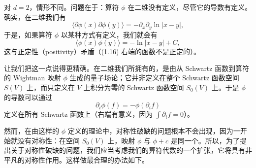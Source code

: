 
对 $d=2$，情形不同。问题在于：算符 $\phi$ 在二维没有定义，尽管它的导数有定义。确实，在二维我们有
\begin{equation}
  \tag{1.15}
  \label{eq:1-15}
  \langle\partial\phi(x)\partial\phi(y)\rangle=-\partial_x\partial_y\ln|x-y|,
\end{equation}
于是，如果算符 $\phi$ 以某种方式有定义，我们就会有
\begin{equation}
  \tag{1.16}
  \label{eq:1-16}
  \langle\phi(x)\phi(y)\rangle=-\ln|x-y|+C,
\end{equation}
这与正定性（positivity）矛盾（(1.16) 右端的函数不是正定的）。


让我们把这一点说得更精确。在二维我们所拥有的，是由从 Schwartz 函数到算符的 Wightman 映射 $\phi$ 生成的量子场论；它并非定义在整个 Schwartz 函数空间 $S(V)$ 上，而只定义在 $V$ 上积分为零的 Schwartz 函数空间 $S_0(V)$ 上。于是 $\phi$ 的导数可以通过
\[
\partial_i\phi(f)=-\phi(\partial_i f)
\]
定义在所有 Schwartz 函数上（右端有意义，因为 $\int\partial_i f=0$）。

然而，在由这样的 $\phi$ 定义的理论中，对称性破缺的问题根本不会出现，因为一开始就没有对称性：在空间 $S_0(V)$ 上，映射 $\phi$ 与 $\phi+c$ 是同一个。所以，为了提出关于对称性破缺的问题，我们应当考虑我们的算符代数的一个扩张，它将具有非平凡的对称性作用。这样做最合理的办法如下。

